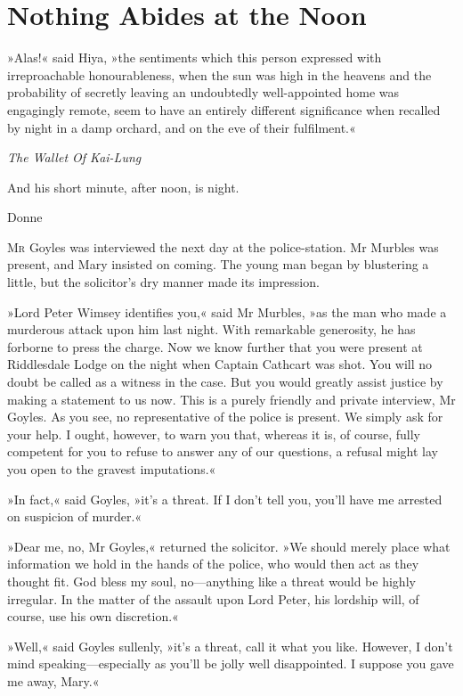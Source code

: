 

\chapter{Nothing Abides at the Noon}


\epigraph{»Alas!« said Hiya, »the sentiments which this person expressed with irreproachable honourableness, when the sun was high in the heavens and the probability of secretly leaving an undoubtedly well-appointed home was engagingly remote, seem to have an entirely different significance when recalled by night in a damp orchard, and on the eve of their fulfilment.«}{\textit{The Wallet Of Kai-Lung}}

\epigraph{And his short minute, after noon, is night.}{Donne}


\lettrine[lines=4]{M}{r} Goyles was interviewed the next day at the police-station. Mr  Murbles was present, and Mary insisted on coming. The young man began by blustering a little, but the solicitor's dry manner made its impression.

»Lord Peter Wimsey identifies you,« said Mr Murbles, »as the man who made a murderous attack upon him last night. With remarkable generosity, he has forborne to press the charge. Now we know further that you were present at Riddlesdale Lodge on the night when Captain Cathcart was shot. You will no doubt be called as a witness in the case. But you would greatly assist justice by making a statement to us now. This is a purely friendly and private interview, Mr Goyles.  As you see, no representative of the police is present. We simply ask for your help. I ought, however, to warn you that, whereas it is, of course, fully competent for you to refuse to answer any of our questions, a refusal might lay you open to the gravest imputations.«

»In fact,« said Goyles, »it's a threat. If I don't tell you, you'll have me arrested on suspicion of murder.«

»Dear me, no, Mr Goyles,« returned the solicitor. »We should merely place what information we hold in the hands of the police, who would then act as they thought fit. God bless my soul, no—anything like a threat would be highly irregular. In the matter of the assault upon Lord Peter, his lordship will, of course, use his own discretion.«

»Well,« said Goyles sullenly, »it's a threat, call it what you like.  However, I don't mind speaking—especially as you'll be jolly well disappointed. I suppose you gave me away, Mary.«

